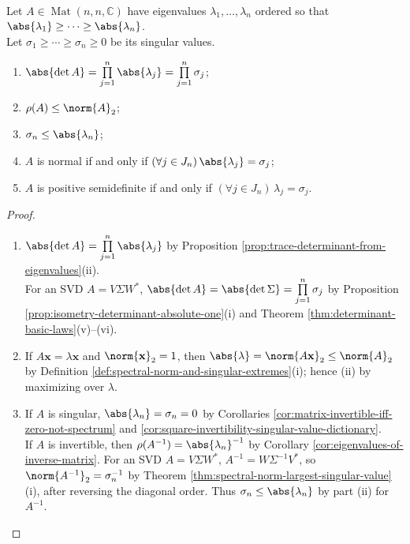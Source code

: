 \begin{theorem} \label{thm:eigenvalues-versus-singular-values} \\
Let $A\in\operatorname{Mat}(n,n,\mathbb{C})$ have eigenvalues $\lambda_1,\ldots,\lambda_n$ ordered so that $\abs{\lambda_1}\geq\cdots\geq\abs{\lambda_n}$.\\
Let $\sigma_1\geq\cdots\geq\sigma_n\geq0$ be its singular values.
\begin{enumerate}[label=(\roman*)]
\setlength{\itemsep}{0pt}
\item $\abs{\det A}=\prod\limits_{j=1}^{n}\abs{\lambda_j}=\prod\limits_{j=1}^{n}\sigma_j$;
\item $\rho(A)\leq\norm{A}_2$;
\item $\sigma_n\leq\abs{\lambda_n}$;
\item $A$ is normal if and only if $(\forall j\in J_n)\,\abs{\lambda_j}=\sigma_j$;
\item $A$ is positive semidefinite if and only if $(\forall j\in J_n)\,\lambda_j=\sigma_j$.
\end{enumerate}
\begin{proof}
\begin{enumerate}[label=(\roman*)]
\setlength{\itemsep}{0pt}
\item[$(i)$] $\abs{\det A}=\prod\limits_{j=1}^{n}\abs{\lambda_j}$ by Proposition \ref{prop:trace-determinant-from-eigenvalues}(ii).\\
For an SVD $A=V\Sigma W^*$, $\abs{\det A}=\abs{\det\Sigma}=\prod\limits_{j=1}^{n}\sigma_j$ by Proposition \ref{prop:isometry-determinant-absolute-one}(i) and Theorem \ref{thm:determinant-basic-laws}(v)--(vi).
\item[$(ii)$] If $A\mathbf{x}=\lambda\mathbf{x}$ and $\norm{\mathbf{x}}_2=1$, then $\abs{\lambda}=\norm{A\mathbf{x}}_2\leq\norm{A}_2$ by Definition \ref{def:spectral-norm-and-singular-extremes}(i); hence (ii) by maximizing over $\lambda$.
\item[$(iii)$] If $A$ is singular, $\abs{\lambda_n}=\sigma_n=0$ by Corollaries \ref{cor:matrix-invertible-iff-zero-not-spectrum} and \ref{cor:square-invertibility-singular-value-dictionary}.\\
If $A$ is invertible, then $\rho(A^{-1})=\abs{\lambda_n}^{-1}$ by Corollary \ref{cor:eigenvalues-of-inverse-matrix}. For an SVD $A=V\Sigma W^*$, $A^{-1}=W\Sigma^{-1}V^*$, so $\norm{A^{-1}}_2=\sigma_n^{-1}$ by Theorem \ref{thm:spectral-norm-largest-singular-value}(i), after reversing the diagonal order. Thus $\sigma_n\leq\abs{\lambda_n}$ by part (ii) for $A^{-1}$.

\end{enumerate}
\end{proof}
\end{theorem}
